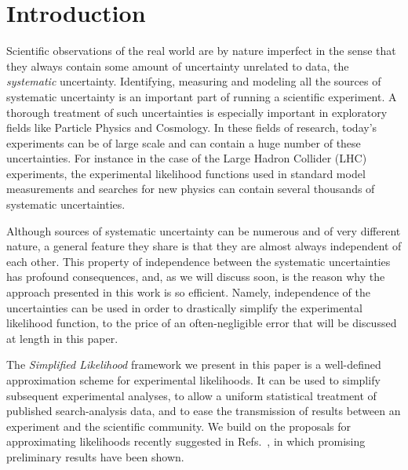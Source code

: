 \documentclass[11pt]{article}
\begin{document}



\noindent
\newpage




\section{Introduction}


Scientific observations of the real world are by nature imperfect in the sense that they always contain some amount of
 uncertainty unrelated to data, the \textit{systematic}   uncertainty. Identifying, measuring and modeling all the sources of systematic uncertainty is an important part of running a scientific experiment. A thorough treatment of such uncertainties is especially important in exploratory fields like Particle Physics and Cosmology. In these fields of research,  %
today's experiments  can be of large scale and can contain a huge number of these  uncertainties. For instance in the case of the Large Hadron Collider (LHC) experiments, the experimental likelihood functions used in standard model measurements and searches for new physics can contain several thousands of systematic uncertainties.

Although sources of systematic uncertainty can be numerous and of very different nature, a general feature they share is that they are almost always independent of each other. This property of independence between the systematic uncertainties has profound consequences, and, as we will discuss soon, is the reason why the approach presented in this work is so efficient. Namely, independence of the uncertainties can be used in order to drastically simplify the experimental likelihood function, to the price of an often-negligible error that will be discussed at length in this paper.

The \textit{Simplified Likelihood} framework we present in this paper is a well-defined approximation scheme for experimental likelihoods. It can be used to simplify subsequent experimental analyses, to allow a uniform statistical treatment of published search-analysis data, and to ease the transmission of results between an experiment and the scientific community.
We build on the proposals for approximating likelihoods recently suggested in Refs.~\cite{Fichet:2016gvx,SL_note}, in which promising preliminary results have been shown.
\end{document}
